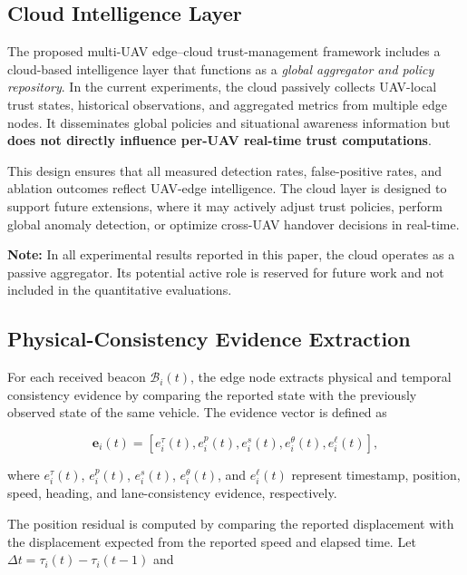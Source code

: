 \documentclass[journal]{IEEEtran}
\begin{document}
\subsection{Cloud Intelligence Layer}
\label{subsec:cloud_intelligence}

The proposed multi-UAV edge--cloud trust-management framework includes a
cloud-based intelligence layer that functions as a \emph{global aggregator
and policy repository}. In the current experiments, the cloud passively
collects UAV-local trust states, historical observations, and aggregated
metrics from multiple edge nodes. It disseminates global policies and
situational awareness information but \textbf{does not directly influence
per-UAV real-time trust computations}.

This design ensures that all measured detection rates, false-positive rates,
and ablation outcomes reflect UAV-edge intelligence. The cloud layer is
designed to support future extensions, where it may actively adjust trust
policies, perform global anomaly detection, or optimize cross-UAV handover
decisions in real-time.

\textbf{Note:} In all experimental results reported in this paper, the cloud
operates as a passive aggregator. Its potential active role is reserved for
future work and not included in the quantitative evaluations.

\subsection{Physical-Consistency Evidence Extraction}
\label{subsec:physical_evidence}

For each received beacon \(\mathcal{B}_i(t)\), the edge node extracts physical and temporal consistency evidence by comparing the reported state with the previously observed state of the same vehicle. The evidence vector is defined as

\begin{equation}
\mathbf{e}_i(t)=
[e_i^{\tau}(t), e_i^{p}(t), e_i^{s}(t), e_i^{\theta}(t), e_i^{\ell}(t)],
\label{eq:evidence_vector}
\end{equation}

where \(e_i^{\tau}(t)\), \(e_i^{p}(t)\), \(e_i^{s}(t)\), \(e_i^{\theta}(t)\), and \(e_i^{\ell}(t)\) represent timestamp, position, speed, heading, and lane-consistency evidence, respectively.

The position residual is computed by comparing the reported displacement with the displacement expected from the reported speed and elapsed time. Let \(\Delta t=\tau_i(t)-\tau_i(t-1)\) and
\end{document}
